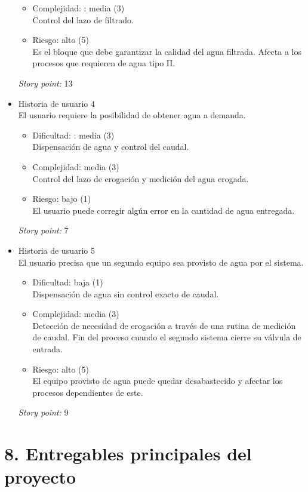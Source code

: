 \documentclass[
11pt, %
]{charter}
\begin{document}
\begin{itemize}
\begin{itemize}
		\item Complejidad: : media (3)
		\\Control del lazo de filtrado.
		\item Riesgo: alto (5)
		\\Es el bloque que debe garantizar la calidad del agua filtrada. Afecta a los procesos que requieren de agua tipo II.
	\end{itemize}
\textit{Story point:} 13
\item  Historia de usuario 4
\\El usuario requiere la posibilidad de obtener agua a demanda.
	\begin{itemize}
		\item Dificultad: : media (3)
		\\Dispensación de agua y control del caudal.
		\item Complejidad: media (3)
		\\Control del lazo de erogación y medición del agua erogada.
		\item Riesgo: bajo (1)
		\\El usuario puede corregir algún error en la cantidad de agua entregada.
	\end{itemize}
\textit{Story point:} 7
\item  Historia de usuario 5
\\El usuario precisa que un segundo equipo sea provisto de agua por el sistema.
	\begin{itemize}
		\item Dificultad: baja (1)
		\\Dispensación de agua sin control exacto de caudal.
		\item Complejidad: media (3)
		\\Detección de necesidad de erogación a través de una rutina de medición de caudal. Fin del proceso cuando el segundo sistema cierre su válvula de entrada.
		\item Riesgo: alto (5)
		\\El equipo provisto de agua puede quedar desabastecido y afectar los procesos dependientes de este.
	\end{itemize}
\textit{Story point:} 9
\end{itemize}

\section{8. Entregables principales del proyecto}
\label{sec:entregables}
\end{document}
